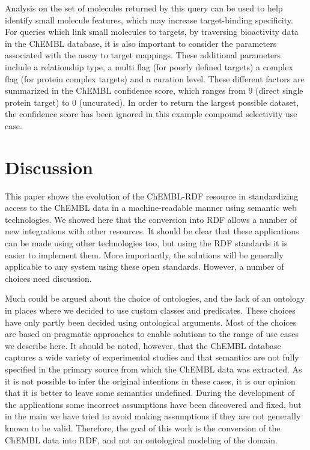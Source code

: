 \documentclass[10pt]{bmc_article}
\newenvironment{bmcformat}{\begin{raggedright}\baselineskip20pt\sloppy\setboolean{publ}{false}}{\end{raggedright}\baselineskip20pt\sloppy}
\begin{document}
\begin{bmcformat}
Analysis on the set of molecules returned by this query can be used to help identify small 
molecule features, which may increase target-binding specificity. For queries which link 
small molecules to targets, by traversing bioactivity data in the ChEMBL database, it is 
also important to consider the parameters associated with the assay to target mappings. 
These additional parameters include a relationship type, a multi flag (for poorly defined
targets) a complex flag (for protein complex targets) and a curation level. These different 
factors are summarized in the ChEMBL confidence score, which ranges from 9 (direct single 
protein target) to 0 (uncurated). In order to return the largest possible dataset, the 
confidence score has been ignored in this example compound selectivity use case.

\section*{Discussion}

This paper shows the evolution of the ChEMBL-RDF resource in standardizing access to the
ChEMBL data in a machine-readable manner using semantic web technologies. We showed here
that the conversion into RDF allows a number of new integrations with other resources.
It should be clear that these applications can be made using other technologies too, but
using the RDF standards it is easier to implement them. More importantly, the solutions
will be generally applicable to any system using these open standards. However, a number
of choices need discussion. 

Much could be argued about the choice of ontologies, and the lack of an
ontology in places where we decided to use custom classes and predicates. These
choices have only partly been decided using ontological arguments. Most of the choices are based
on pragmatic approaches to enable solutions to the range of use cases we describe here. It should be noted,
however, that the ChEMBL database captures a wide variety of experimental studies
and that semantics are not fully specified in the primary source from which the ChEMBL data was
extracted. As it is not possible to infer the original intentions in these cases, 
it is our opinion that it is better to leave some semantics undefined. During the 
development of the applications some incorrect assumptions have been discovered and
fixed, but in the main we have tried to avoid making assumptions if they are not generally known to be valid. 
Therefore, the goal of this work is the conversion of the ChEMBL data into
RDF, and not an ontological modeling of the domain.


\end{bmcformat}
\end{document}
